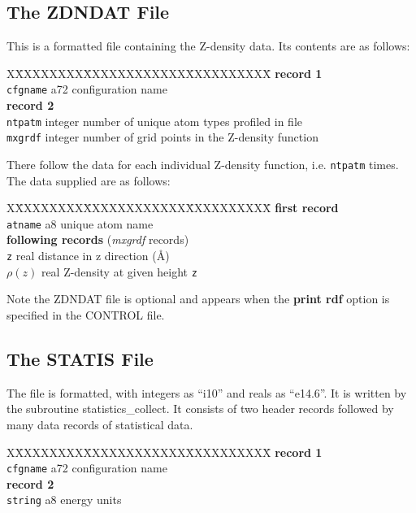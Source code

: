 \subsection{The ZDNDAT File}
\label{zdn-file}

This is a formatted file containing the Z-density data.  Its
contents are as follows:
\begin{tabbing}
X\=XXXXXXXX\=XXXXXXXXXXXX\=XXXXXXXXXX\=\kill
{\bf record 1} \\
\> {\tt cfgname} \> a72    \> configuration name \\
{\bf record 2} \\
\> {\tt ntpatm}  \> integer \> number of unique atom types profiled in file \\
\> {\tt mxgrdf}  \> integer \> number of grid points in the Z-density function \\
\end{tabbing}
There follow the data for each individual Z-density function, i.e.
{\tt ntpatm} times. The data supplied are as follows:
\begin{tabbing}
X\=XXXXXXXX\=XXXXXXXXXXXX\=XXXXXXXXXX\=\kill
{\bf first record} \\
\> {\tt atname}  \> a8      \> unique atom name \\
{\bf following records} ({\em mxgrdf} records) \\
\> {\tt z}       \> real    \> distance in z direction (\AA) \\
\> $\rho(z)$     \> real    \> Z-density at given height {\tt z} \\
\end{tabbing}
Note the ZDNDAT file is optional and appears when the {\bf print
rdf} option is specified in the CONTROL file.

\subsection{The STATIS File}
\label{statis-file}

The file is formatted, with integers as ``i10'' and reals as
``e14.6''.  It is written by the subroutine {\sc
statistics\_collect}.  It consists of two header records followed
by many data records of statistical data.
\begin{tabbing}
X\=XXXXXXXX\=XXXXXXXXXXXX\=XXXXXXXXXX\=\kill
{\bf record 1} \\
\> {\tt cfgname} \> a72 \> configuration name \\
{\bf record 2} \\
\> {\tt string}  \> a8   \> energy units \\
\end{tabbing}


